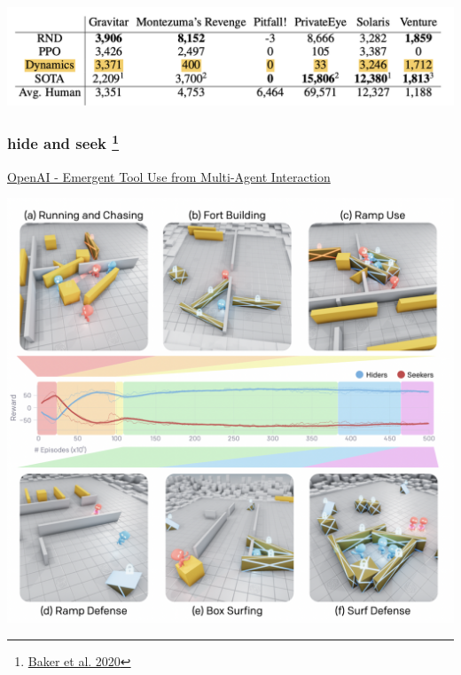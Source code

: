 \documentclass{beamer}
\begin{document}
\begin{frame}
\begin{columns}
  \end{columns}

  \includegraphics[scale=0.25]{../papers_captions/icm_a.png}


\end{frame}



\begin{frame}
  
  \frametitle{hide and seek \footnote{\href{https://arxiv.org/pdf/1909.07528.pdf}{Baker et al. 2020}}}
  \href{https://openai.com/blog/emergent-tool-use/}{OpenAI - Emergent Tool Use from Multi-Agent Interaction}

  \includegraphics[scale=0.3]{../images/hide_and_seek.png}

\end{frame}
\end{document}

